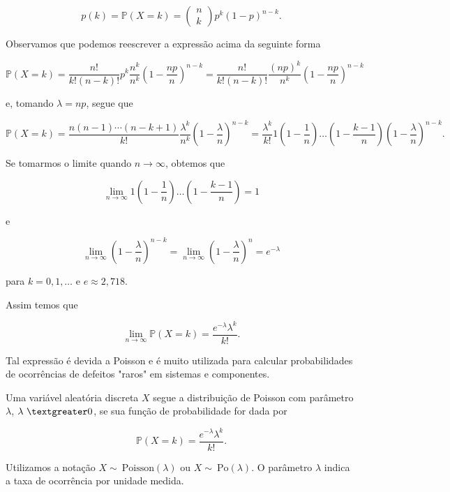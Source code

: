 \documentclass[10pt,a4paper]{article}
\begin{document}
\[p(k)=\mathbb{P}(X=k)=\left(\begin{array}{c}n\\k\end{array}\right)p^k(1-p)^{n-k}.\] 	

Observamos que podemos reescrever a expressão acima da seguinte forma

\[\mathbb{P}(X=k)=\frac{n!}{k!(n-k)!}p^k\frac{n^k}{n^k}\left(1-\frac{np}{n}\right)^{n-k}=\frac{n!}{k!(n-k)!}\frac{(np)^k}{n^k}\left(1-\frac{np}{n}\right)^{n-k}\] 	

e, tomando $ \lambda = np $, segue que

\[\mathbb{P}(X = k)=\frac{n(n-1)\cdots(n-k+1)}{k!}\frac{\lambda^k}{n^k}\left(1-\frac{\lambda}{n}\right)^{n-k}=\frac{\lambda^k}{k!}1\left(1-\frac{1}{n}\right)\dots\left(1-\frac{k-1}{n}\right)\left(1-\frac{\lambda}{n}\right)^{n-k}.\] 	

Se tomarmos o limite quando $ n\rightarrow \infty $, obtemos que

\[\lim_{n\rightarrow \infty}1\left(1-\frac{1}{n}\right)\dots\left(1-\frac{k-1}{n}\right)=1\] 	

e

\[\lim_{n\rightarrow \infty}\left(1-\frac{\lambda}{n}\right)^{n-k}=\lim_{n\rightarrow \infty}\left(1-\frac{\lambda}{n}\right)^{n}=e^{-\lambda}\] 	

para $ k = 0,1,\ldots $ e $ e\approx 2,718 $.

Assim temos que 

\[\lim_{n\rightarrow \infty}\mathbb{P}(X=k)=\frac{e^{-\lambda}\lambda^k}{k!}.\] 	

Tal expressão é devida a Poisson e é muito utilizada para calcular probabilidades de ocorrências de defeitos "raros" em sistemas e componentes.

\begin{df}
	Uma variável aleatória discreta $ X $ segue a distribuição de Poisson com parâmetro $ \lambda $, $ \lambda \ \textgreater 0 $, se sua função de probabilidade for dada por

	\[\mathbb{P}(X=k)=\frac{e^{-\lambda}\lambda^k}{k!}.\] 	

	Utilizamos a notação $ X \sim \ \text{Poisson}(\lambda) $ ou $ X\sim \ \text{Po}(\lambda) $. O parâmetro $ \lambda $ indica a taxa de ocorrência por unidade medida.
\end{df}
\end{document}
